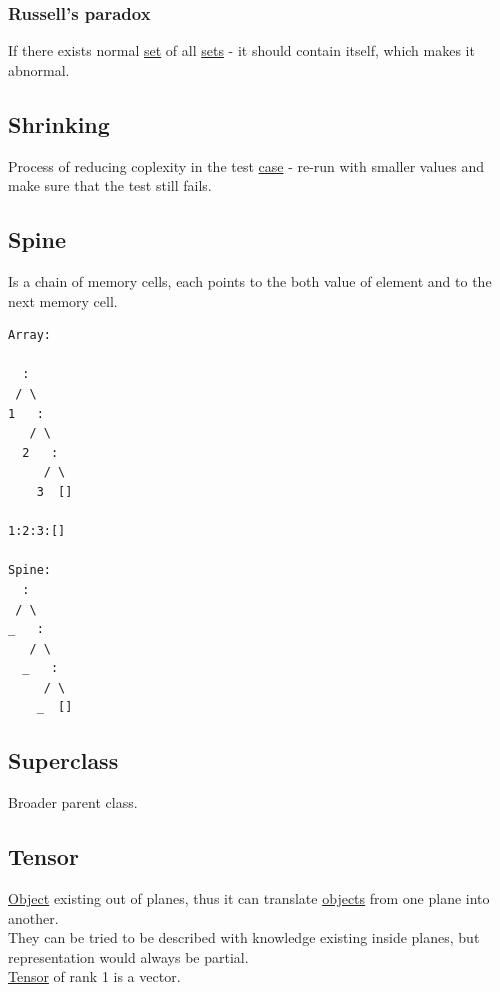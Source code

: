 \documentclass[11pt]{article}
\begin{document}
\subsubsection{\label{orgfc3e54f}Russell's paradox}
\label{sec:org8f2d3a5}
If there exists normal \hyperref[orgbed80ba]{set} of all \hyperref[org4e7443a]{sets} - it should contain itself, which makes it abnormal.\\

\subsection{\label{org6a14777}Shrinking}
\label{sec:orgd838411}
Process of reducing coplexity in the test \hyperref[org96bceb0]{case} - re-run with smaller values and make sure that the test still fails.\\

\subsection{\label{orgfd4e089}Spine}
\label{sec:orgf6971de}
Is a chain of memory cells, each points to the both value of element and to the next memory cell.\\
\begin{verbatim}
Array:

  :
 / \
1   :
   / \
  2   :
     / \
    3  []

1:2:3:[]

Spine:
  :
 / \
_   :
   / \
  _   :
     / \
    _  []

\end{verbatim}

\subsection{\label{org2d4bc47}Superclass}
\label{sec:orgb4e735f}
Broader parent class.\\

\subsection{\label{orgae4c474}Tensor}
\label{sec:org876bb45}
\hyperref[org025aac8]{Object} existing out of planes, thus it can translate \hyperref[orge0f000f]{objects} from one plane into another.\\
They can be tried to be described with knowledge existing inside planes, but representation would always be partial.\\
\hyperref[orgae4c474]{Tensor} of rank 1 is a vector.\\
\end{document}
